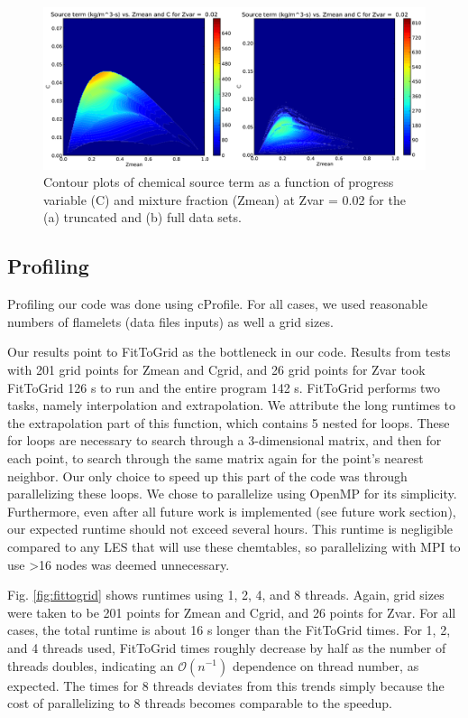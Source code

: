 \documentclass[11pt]{article}
\begin{document}
\begin{figure} [h]
\centering
\includegraphics[width=\textwidth]{ya_yb}
\caption{\label{fig:ya_yb} Contour plots of chemical source term as a function of progress variable (C) and mixture fraction (Zmean) at Zvar = 0.02 for the (a) truncated and (b) full data sets.}
\end{figure}

\subsection{Profiling}
Profiling our code was done using cProfile. For all cases, we used reasonable numbers of flamelets (data files inputs) as well a grid sizes.

Our results point to FitToGrid as the bottleneck in our code. Results from tests with 201 grid points for Zmean and Cgrid, and 26 grid points for Zvar took FitToGrid 126 s to run and the entire program 142 s. FitToGrid performs two tasks, namely interpolation and extrapolation. We attribute the long runtimes to the extrapolation part of this function, which contains 5 nested for loops. These for loops are necessary to search through a 3-dimensional matrix, and then for each point, to search through the same matrix again for the point’s nearest neighbor. Our only choice to speed up this part of the code was through parallelizing these loops. We chose to parallelize using OpenMP for its simplicity. Furthermore, even after all future work is implemented (see future work section), our expected runtime should not exceed several hours. This runtime is negligible compared to any LES that will use these chemtables, so parallelizing with MPI to use >16 nodes was deemed unnecessary.

Fig. \ref{fig:fittogrid} shows runtimes using 1, 2, 4, and 8
threads. Again, grid sizes were taken to be 201 points for Zmean and
Cgrid, and 26 points for Zvar. For all cases, the total runtime is
about 16 s longer than the FitToGrid times. For 1, 2, and 4 threads
used, FitToGrid times roughly decrease by half as the number of
threads doubles, indicating an $\mathcal{O}(n^{-1})$ dependence on
thread number, as expected. The times for 8 threads deviates from this
trends simply because the cost of parallelizing to 8 threads becomes
comparable to the speedup.
\end{document}
